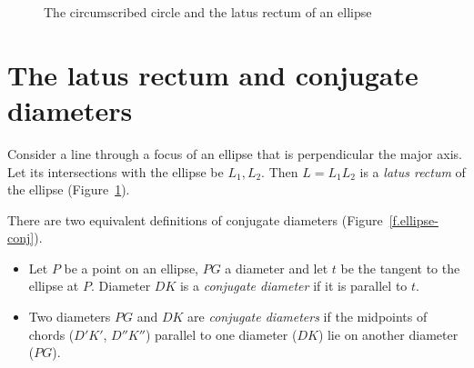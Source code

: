 
\begin{figure}[b]
\begin{center}
\caption{The circumscribed circle and the latus rectum of an ellipse}\label{f.ellipse-latus-rectum-def}
\end{center}
\end{figure}


\section{The latus rectum and conjugate diameters}

\begin{definition}\label{def.ellipse-lr}
Consider a line through a focus of an ellipse that is perpendicular the major axis. Let its intersections with the ellipse be $L_1,L_2$. Then $L=L_1L_2$ is a \emph{latus rectum} of the ellipse (Figure~\ref{f.ellipse-latus-rectum-def}).
\end{definition}

\begin{definition}\label{def.conjugate}
There are two equivalent definitions of conjugate diameters  (Figure~\ref{f.ellipse-conj}).
\begin{itemize}
\item Let $P$ be a point on an ellipse, $PG$ a diameter and let $t$ be the tangent to the ellipse at $P$. Diameter $DK$ is a \emph{conjugate diameter} if it is parallel to $t$.
\item Two diameters $PG$ and $DK$ are \emph{conjugate diameters} if the midpoints of chords ($D'K'$, $D''K''$) parallel to one diameter ($DK$) lie on another diameter ($PG$).
\end{itemize}
\end{definition}

